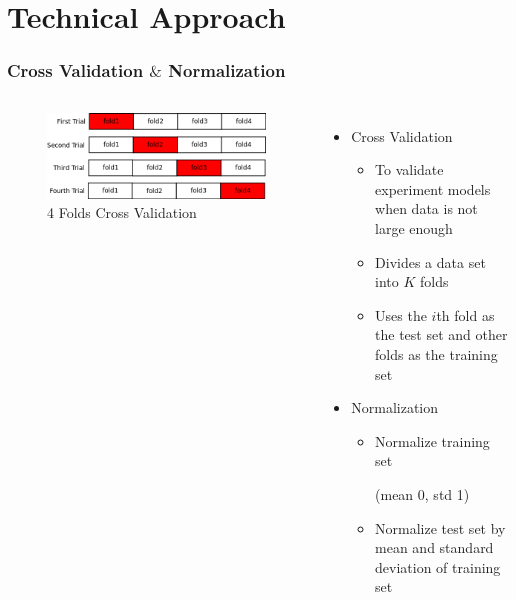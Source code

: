 \documentclass{beamer}
\begin{document}
\section{Technical Approach}
\begin{frame}
\frametitle{Cross Validation $\&$ Normalization}
\begin{columns}
\begin{figure}[tb]
    \centering
    \includegraphics[width=\textwidth]{../paper/pictures/figures/CV.png}
    \caption{4 Folds Cross Validation}
    \label{fig:CV}
\end{figure}

\begin{itemize}
\item Cross Validation
	\begin{itemize}
	\item To validate experiment models when data is not large enough
	\item Divides a data set into $K$ folds
	\item Uses the $i$th fold as the test set and other folds as the training set
	\end{itemize}
\item Normalization
	\begin{itemize}
	\item Normalize training set
	
	(mean 0, std 1)
	\item Normalize test set by mean and standard deviation of training set
	\end{itemize}
\end{itemize}
\end{columns}
\end{frame}
\end{document}
